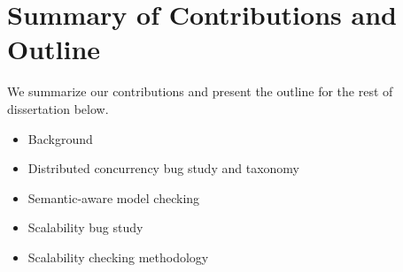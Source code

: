 \section{Summary of Contributions and Outline}

We summarize our contributions and present the outline for the rest of
dissertation below.

\begin{itemize}

\item Background

\item Distributed concurrency bug study and taxonomy

\item Semantic-aware model checking

\item Scalability bug study

\item Scalability checking methodology

\end{itemize}
